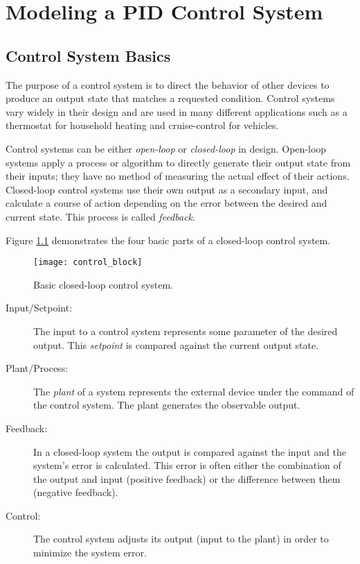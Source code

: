 \documentclass[openany,11pt,fleqn]{book} %
\begin{document}
	
\chapter{Modeling a PID Control System}

\section{Control System Basics}
The purpose of a control system is to direct the behavior of other devices to produce an output state that matches a requested condition. Control systems vary widely in their design and are used in many different applications such as a thermostat for household heating and cruise-control for vehicles.

Control systems can be either \textit{open-loop} or \textit{closed-loop} in design. Open-loop systems apply a process or algorithm to directly generate their output state from their inputs; they have no method of measuring the actual effect of their actions. Closed-loop control systems use their own output as a secondary input, and calculate a course of action depending on the error between the desired and current state. This process is called \textit{feedback}.

Figure \ref{control_block} demonstrates the four basic parts of a closed-loop control system. 

\begin{figure}[tb]
    \centering\texttt{[image: control\_block]}
    \caption{Basic closed-loop control system.}
    \label{control_block}
\end{figure}

\begin{description}
    \item [Input/Setpoint:] The input to a control system represents some parameter of the desired output. This \textit{setpoint} is compared against the current output state. 
    \item [Plant/Process:] The \textit{plant} of a system represents the external device under the command of the control system. The plant generates the observable output.
    \item [Feedback:] In a closed-loop system the output is compared against the input and the system's error is calculated. This error is often either the combination of the output and input (positive feedback) or the difference between them (negative feedback).
    \item [Control:] The control system adjusts its output (input to the plant) in order to minimize the system error. 
\end{description}
\end{document}
